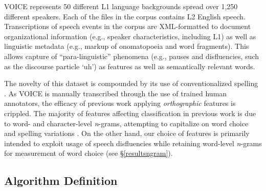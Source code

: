 \documentclass[11pt]{article}
\begin{document}
VOICE represents 50 different L1 language backgrounds spread over 1,250 different speakers. Each of the files in the corpus contains L2 English speech. Transcriptions of speech events in the corpus are XML-formatted to document organizational information (e.g., speaker characteristics, including L1) as well as linguistic metadata (e.g., markup of onomatopoeia and word fragments). This allows capture of ``para-linguistic'' phenomena (e.g., pauses and disfluencies, such as the discourse particle `uh') as features as well as semantically relevant words. 

The novelty of this dataset is compounded by its use of conventionalized spelling \cite{VOICEConv}. As VOICE is manually transcribed through the use of trained human annotators, the efficacy of previous work applying \emph{orthographic} features is crippled. The majority of features affecting classification in previous work is due to word- and character-level \emph{n}-grams, attempting to capitalize on word choice and spelling variations \cite{Koppel2005a,Tsur2007}. On the other hand, our choice of features is primarily intended to exploit usage of speech disfluencies while retaining word-level \emph{n}-grams for measurement of word choice (see \S\ref{resultsngram}).


\subsection{Algorithm Definition}
\end{document}
